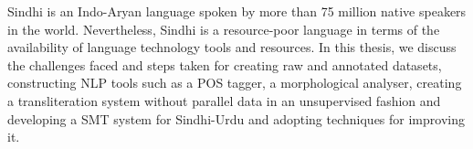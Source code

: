 Sindhi is an Indo-Aryan language spoken by more than 75 million native speakers in the world. Nevertheless, Sindhi is a resource-poor language in terms of the availability of language technology tools and resources. In this thesis, we discuss the challenges faced and steps taken for creating raw and annotated datasets, constructing NLP tools such as a POS tagger, a morphological analyser, creating a transliteration system without parallel data in an unsupervised fashion and developing a SMT system for Sindhi-Urdu and adopting techniques for improving it.
